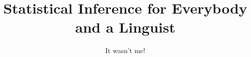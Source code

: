 \author{It wasn't me!}
\title{Statistical Inference for Everybody and a Linguist}
\subtitle{}
\renewcommand{\lsSeries}{tbls}
\renewcommand{\lsSeriesNumber}{}


\def\lsBookDOI{}
\def\lsISBNhardcover{}
\def\lsISBNsoftcover{}
\def\lsISBNdigital{}
\def\lsID{}
